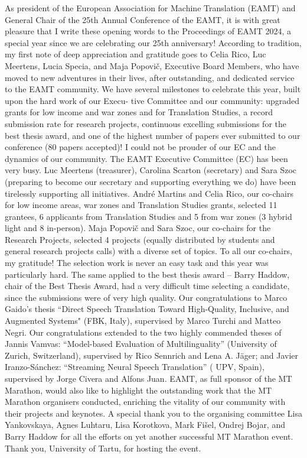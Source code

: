 As president of the European Association for Machine Translation (EAMT) and General Chair of the 25th Annual Conference of the EAMT, it is with great pleasure that I write these opening words to the Proceedings of EAMT 2024, a special year since we are celebrating our 25th anniversary!
According to tradition, my first note of deep appreciation and gratitude goes to Celia Rico, Luc Meertens, Lucia Specia, and Maja Popovič, Executive Board Members, who have moved to new adventures in their lives, after outstanding, and dedicated service to the EAMT community.
We have several milestones to celebrate this year, built upon the hard work of our Execu- tive Committee and our community: upgraded grants for low income and war zones and for Translation Studies, a record submission rate for research projects, continuous excelling submissions for the best thesis award, and one of the highest number of papers ever submitted to our conference (80 papers accepted)! I could not be prouder of our EC and the dynamics of our community.
The EAMT Executive Committee (EC) has been very busy. Luc Meertens (treasurer), Carolina Scarton (secretary) and Sara Szoc (preparing to become our secretary and supporting everything we do) have been tirelessly supporting all initiatives. André Martins and Celia Rico, our co-chairs for low income areas, war zones and Translation Studies grants, selected 11 grantees, 6 applicants from Translation Studies and 5 from war zones (3 hybrid light and 8 in-person). Maja Popovič and Sara Szoc, our co-chairs for the Research Projects, selected 4  projects (equally distributed by students and general research projects calls) with a diverse set of topics. To all our co-chairs, my gratitude! The selection work is never an easy task and this year was particularly hard. 
The same applied to the best thesis award –  Barry Haddow, chair of the Best Thesis Award, had a very difficult time selecting a candidate, since the submissions were of very high quality. Our congratulations to Marco Gaido's thesis “Direct Speech Translation Toward High-Quality, Inclusive, and Augmented Systems" (FBK, Italy), supervised by Marco Turchi and Matteo Negri. Our congratulations extended to the two highly commended theses of Jannis Vamvas: “Model-based Evaluation of Multilinguality” (University of Zurich, Switzerland), supervised by Rico Sennrich and Lena A. Jäger; and Javier Iranzo-Sánchez: “Streaming Neural Speech Translation” ( UPV, Spain), supervised by Jorge Civera and Alfons Juan. 
EAMT, as full sponsor of the MT Marathon, would also like to highlight the outstanding work that the MT Marathon organisers conducted, enriching the vitality of our community with their projects and keynotes. A special thank you to the organising committee Lisa Yankovskaya, Agnes Luhtaru, Lisa Korotkova, Mark Fišel, Ondrej Bojar, and Barry Haddow for all the efforts on yet another successful MT Marathon event. Thank you, University of Tartu, for hosting the event.
